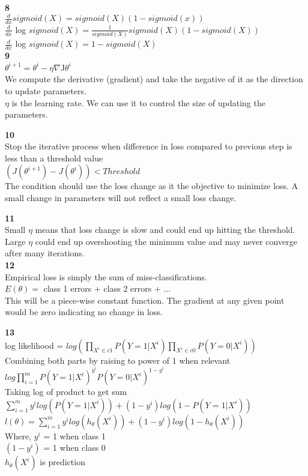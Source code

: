 \documentclass{article}
\begin{document}
\textbf{8}\bigskip \\
$\frac{d}{dx}sigmoid(X) = sigmoid(X)(1-sigmoid(x))$ \bigskip \\
$\frac{d}{dx}$ log $sigmoid(X) = \frac{1}{sigmoid(X)}sigmoid(X)(1-sigmoid(X))$ \bigskip \\
$\frac{d}{dx}$ log $sigmoid(X) = 1-sigmoid(X)$ \bigskip \\

\textbf{9}\bigskip \\
$\theta^{i+1} = \theta^{i} - \eta \nabla$J$\theta^{i}$\bigskip \\
We compute the derivative (gradient) and take the negative of it as the direction to update parameters.\smallskip\\
$\eta$ is the learning rate. We can use it to control the size of updating the parameters.

\textbf{10}\bigskip \\
Stop the iterative process when difference in loss compared to previous step is less than a threshold value\bigskip \\
$(J(\theta^{i+1})-J(\theta^{i})) < Threshold$ \smallskip \\
The condition should use the loss change as it the objective to minimize loss. A small change in parameters will not reflect a small loss change.

\textbf{11}\bigskip \\
Small $\eta$ means that loss change is slow and could end up hitting the threshold. \smallskip \\
Large $\eta$ could end up overshooting the minimum value and may never converge after many iterations. \smallskip \\

\textbf{12}\bigskip \\
Empirical loss is simply the sum of miss-classifications.\smallskip \\
$E(\theta) = $ class 1 errors + class 2 errors + $\dots$ \bigskip\\
This will be a piece-wise constant function. The gradient at any given point would be zero indicating no change in loss.

\textbf{13}\bigskip \\
log likelihood = $log(\prod_{X^{i}\in c1}P(Y=1|X^{i})\prod_{X^{i}\in c0}P(Y=0|X^{i}))$ \smallskip\\
Combining both parts by raising to power of 1 when relevant \smallskip \\
$log\prod_{i=1}^{m}P(Y=1|X^{i})^{y^{i}}P(Y=0|X^{i})^{1-y^{i}}$ \smallskip \\
Taking log of product to get sum \smallskip \\
$\sum_{i=1}^{m}y^{i}log(P(Y=1|X^{i}))+(1-y^{i})log(1-P(Y=1|X^{i}))$ \smallskip \\
$l(\theta) = \sum_{i=1}^{m}y^{i}log(h_{\theta}(X^{i}))+(1-y^{i})log(1-h_{\theta}(X^{i}))$ \bigskip \\
Where, $y^{i}$ = 1 when class 1\\
$(1-y^{i})$ = 1 when class 0\\
$h_{\theta}(X^{i})$ is prediction \bigskip \\
\end{document}
